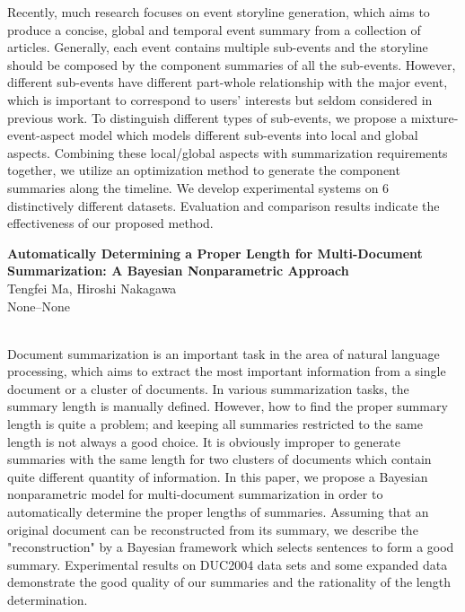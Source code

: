 \documentclass[twoside,makeidx]{book}
\begin{document}
{\small Recently, much research focuses on event storyline generation, which aims to produce a concise, global and temporal event summary from a collection of articles. Generally, each event contains multiple sub-events and the storyline should be composed by the component summaries of all the sub-events. However, different sub-events have different part-whole relationship with the major event, which is important to correspond to users' interests but seldom considered in previous work. To distinguish different types of sub-events, we propose a mixture-event-aspect model which models different sub-events into local and global aspects. Combining these local/global aspects with summarization requirements together, we utilize an optimization method to generate the component summaries along the timeline. We develop experimental systems on 6 distinctively different datasets. Evaluation and comparison results indicate the effectiveness of our proposed method.}
\par\vspace{2em}\noindent%
\begin{minipage}{\linewidth}%
\begin{center}
\textbf{\normalsize Automatically Determining a Proper Length for Multi-Document Summarization: A Bayesian Nonparametric Approach}\\
\normalsize  Tengfei Ma,  Hiroshi Nakagawa\\
{\small None--None}\\
\end{center}
\end{minipage}\\[0.5em]
\nopagebreak%
\noindent%
{\small Document summarization is an important task in the area of natural language processing, which aims to extract the most important information from a single document or a cluster of documents. In various summarization tasks, the summary length is manually defined. However, how to find the proper summary length is quite a problem; and keeping all summaries restricted to the same length is not always a good choice. It is obviously improper to generate summaries with the same length for two clusters of documents which contain quite different quantity of information. In this paper, we propose a Bayesian nonparametric model for multi-document summarization in order to automatically determine the proper lengths of summaries. Assuming that an original document can be reconstructed from its summary, we describe the "reconstruction" by a Bayesian framework which selects sentences to form a good summary. Experimental results on DUC2004 data sets and some expanded data demonstrate the good quality of our summaries and the rationality of the length determination.}
\end{document}
